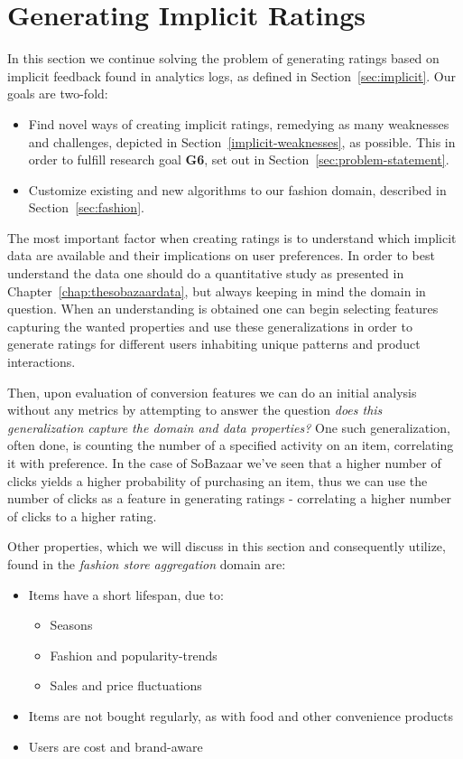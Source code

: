 \section{Generating Implicit Ratings}
\label{sec:implementation-implicit}

In this section we continue solving the problem of generating ratings based on
implicit feedback found in analytics logs, as defined in
Section~\ref{sec:implicit}. Our goals are two-fold:

\begin{itemize}
  \item Find novel ways of creating implicit ratings, remedying as many
  weaknesses and challenges, depicted in Section~\ref{implicit-weaknesses}, as
  possible. This in order to fulfill research goal \textbf{G6}, set out in
  Section~\ref{sec:problem-statement}.
  \item Customize existing and new algorithms to our fashion domain, described
  in Section~\ref{sec:fashion}.
\end{itemize}

The most important factor when creating ratings is to understand which implicit
data are available and their implications on user preferences. In order to best
understand the data one should do a quantitative study as presented in
Chapter~\ref{chap:thesobazaardata}, but always keeping in mind the domain in question.
When an understanding is obtained one can begin selecting features capturing
the wanted properties and use these generalizations in order to generate
ratings for different users inhabiting unique patterns and product
interactions.

Then, upon evaluation of conversion features we can do an initial analysis
without any metrics by attempting to answer the question \textit{does this
generalization capture the domain and data properties?}
One such generalization, often done, is counting the number of a specified
activity on an item, correlating it with preference. In the case of SoBazaar
we've seen that a higher number of clicks yields a higher probability of
purchasing an item, thus we can use the number of clicks as a feature in
generating ratings - correlating a higher number of clicks to a higher rating.

Other properties, which we will discuss in this section and consequently
utilize, found in the \textit{fashion store aggregation} domain are:

\begin{itemize}
  \item Items have a short lifespan, due to:
  \begin{itemize}
    \item Seasons
    \item Fashion and popularity-trends
    \item Sales and price fluctuations
  \end{itemize}
  \item Items are not bought regularly, as with food and other convenience
  products
  \item Users are cost and brand-aware
\end{itemize}

